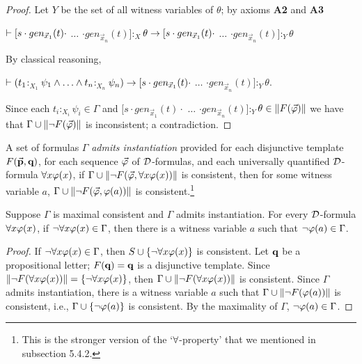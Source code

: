 \begin{proof}
	\qquad Let $Y$ be the set of all witness variables of $\theta$; by axioms \textbf{A2} and \textbf{A3}
	
	\begin{center}
		$\vdash [s\cdot gen_{\vec{x}_{1}}(t) \cdot$ $\dots$ $\cdot gen_{\vec{x}_{n}}(t) ]$$:_{X}$$\theta \rightarrow  [s\cdot gen_{\vec{x}_{1}}(t) \cdot$ $\dots$ $\cdot gen_{\vec{x}_{n}}(t) ]$$:_{Y}$$\theta$
	\end{center}
By classical reasoning,
	
	\begin{center}
		$\vdash (t_{1}$$:_{X_{1}}$$\psi_{1} \e \dots \e t_{n}$$:_{X_{n}}$$\psi_{n}) \rightarrow  [s\cdot gen_{\vec{x}_{1}}(t) \cdot$ $\dots$ $\cdot gen_{\vec{x}_{n}}(t) ]$$:_{Y}$$\theta$.
	\end{center}
	
	
	\qquad Since each $t_{i}$$:_{X_{i}}$$\psi_{i} \in \Gamma$ and $[s\cdot gen_{\vec{x}_{1}}(t) \cdot$ $\dots$ $\cdot gen_{\vec{x}_{n}}(t) ]$$:_{Y}$$\theta \in \Arrowvert F(\vec{\varphi}) \Arrowvert$ we have that $\Gamma \cup \Arrowvert \neg F(\vec{\varphi}) \Arrowvert$ is inconsistent; a contradiction.
\end{proof}



\begin{defn}  
	A set of formulas $\Gamma$ \textit{admits instantiation} provided for each disjunctive template $F(\vec{\textbf{p}},\textbf{q})$, for each sequence $\vec{\varphi}$ of $\mathcal{D}$-formulas, and each universally quantified $\mathcal{D}$-formula $\forall x \varphi (x)$, if $\Gamma \cup \Arrowvert \neg F(\vec{\varphi},\forall x\varphi(x)) \Arrowvert$ is consistent, then for some witness variable $a$, $\Gamma \cup \Arrowvert \neg F(\vec{\varphi},\varphi(a)) \Arrowvert$ is consistent.\footnote{This is the stronger version of the `$\forall$-property' that we mentioned in subsection 5.4.2.}   
\end{defn}



\begin{pro}
	Suppose $\Gamma$ is maximal consistent and $\Gamma$ admits instantiation. For every $\mathcal{D}$-formula $\forall x \varphi(x)$, if $\neg \forall x \varphi(x) \in \Gamma$, then there is a witness variable $a$ such that $\neg \varphi(a) \in \Gamma$.          
\end{pro}


\begin{proof} 
	
	If $\neg \forall x \varphi (x) \in \Gamma $, then $S\cup \{ \neg \forall x \varphi (x) \}$ is consistent. Let $\textbf{q}$ be a propositional letter; $F(\textbf{q}) =\textbf{q}$ is a disjunctive template. Since $\Arrowvert \neg F(\forall x\varphi(x)) \Arrowvert=  \{ \neg \forall x \varphi (x) \}$, then  $\Gamma \cup \Arrowvert \neg F(\forall x\varphi(x)) \Arrowvert$ is consistent. Since $\Gamma$ admits instantiation, there is a witness variable $a$ such that $\Gamma \cup \Arrowvert \neg F(\varphi(a)) \Arrowvert$ is consistent, i.e., $\Gamma \cup  \{ \neg \varphi (a) \}$ is consistent. By the maximality of $\Gamma$, $ \neg \varphi(a) \in \Gamma$. 
	
\end{proof}


